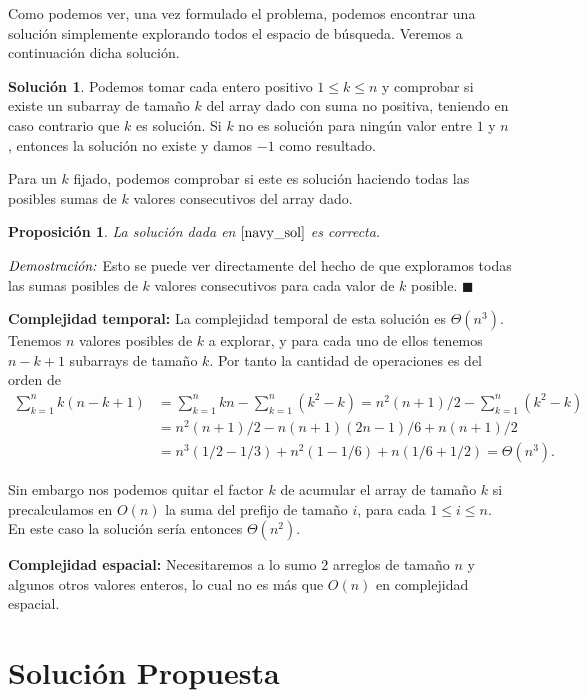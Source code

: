 \documentclass[10pt]{amsart}
\newtheorem{prop}[theorem]{Proposici\'on}
\theoremstyle{definition}
\newtheorem{sol}[theorem]{Soluci\'on}
\numberwithin{equation}{section}
\newcommand{\lqqd}{{\small $\blacksquare$}}
\newcommand{\Proof}[2]{{\vspace{1em} $\emph{Demostración:}$ \textbf{#1} #2 \lqqd \vspace{1em}}}
\begin{document}
	Como podemos ver, una vez formulado el problema, podemos encontrar una soluci\'on simplemente explorando todos el espacio de b\'usqueda. Veremos a continuaci\'on dicha soluci\'on.
	
	\begin{sol}\label{navy_sol}
		Podemos tomar cada entero positivo $1 \le k \le n$ y comprobar si existe un subarray de tama\~no $k$ del array dado con suma no positiva, teniendo en caso contrario que $k$ es soluci\'on. Si $k$ no es soluci\'on para ning\'un valor entre $1$ y $n$, entonces la soluci\'on no existe y damos $-1$ como resultado.
		
		Para un $k$ fijado, podemos comprobar si este es soluci\'on haciendo todas las posibles sumas de $k$ valores consecutivos del array dado.
	\end{sol}

	\begin{prop}
		La soluci\'on dada en $\ref{navy_sol}$ es correcta.
	\end{prop}

        \Proof{}{
        Esto se puede ver directamente del hecho de que exploramos todas las sumas posibles de $k$ valores consecutivos para cada valor de $k$ posible.		
	}

	\textbf{Complejidad temporal:} La complejidad temporal de esta soluci\'on es $\Theta(n^3)$. Tenemos $n$ valores posibles de $k$ a explorar, y para cada uno de ellos tenemos $n - k + 1$ subarrays de tama\~no $k$. Por tanto la cantidad de operaciones es del orden de 
	\begin{align*}
		\sum_{k = 1}^n k(n - k + 1) &= \sum_{k = 1}^n kn - \sum_{k = 1}^n  (k^2 - k) = n^2(n + 1) / 2 - \sum_{k = 1}^n ( k^2 - k) 
		\\ &= n^2(n+1)/2 - n(n+1)(2n-1)/6 + n( n+ 1) / 2 
		\\ &= n^3(1/2 - 1/3) + n^2(1 - 1/6) + n(1/6 + 1/2) = \Theta(n^3).  
	\end{align*}


	Sin embargo nos podemos quitar el factor $k$ de acumular el array de tama\~no $k$ si precalculamos en $O(n)$ la suma del prefijo de tama\~no $i$, para cada $1\le i \le n$. En este caso la soluci\'on ser\'ia entonces $\Theta(n^2)$.
	
	\textbf{Complejidad espacial:} Necesitaremos a lo sumo $2$ arreglos de tama\~no $n$ y algunos otros valores enteros, lo cual no es m\'as que $O(n)$ en complejidad espacial.
	 
	\section{Soluci\'on Propuesta}
\end{document}
